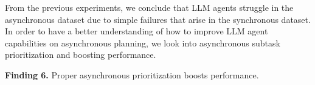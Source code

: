 From the previous experiments, we conclude that LLM agents struggle in the asynchronous dataset due to simple failures that arise in the synchronous dataset. In order to have a better understanding of how to improve LLM agent capabilities on asynchronous planning, we look into asynchronous subtask prioritization and boosting performance.

\textbf{Finding 6.} Proper asynchronous prioritization boosts performance.



